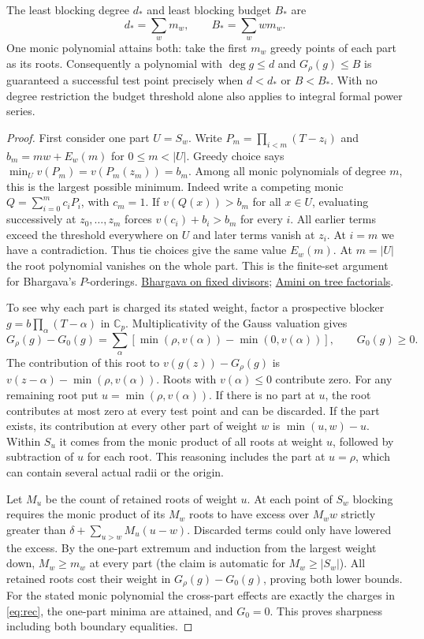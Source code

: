 \begin{theorem}\label{th:exact}
The least blocking degree $d_*$ and least blocking budget $B_*$ are
\[
 d_*=\sum_w m_w,\qquad B_*=\sum_w w m_w.
\]
One monic polynomial attains both: take the first $m_w$ greedy points of each
part as its roots. Consequently a polynomial with $\deg g\le d$ and
$G_\rho(g)\le B$ is guaranteed a successful test point precisely when
$d<d_*$ or $B<B_*$. With no degree restriction the budget threshold alone
also applies to integral formal power series.
\end{theorem}

\begin{proof}
First consider one part $U=S_w$. Write $P_m=\prod_{i<m}(T-z_i)$ and
$b_m=mw+E_w(m)$ for $0\le m<|U|$. Greedy choice says
$\min_U v(P_m)=v(P_m(z_m))=b_m$. Among all monic polynomials of degree
$m$, this is the largest possible minimum. Indeed write a competing
monic $Q=\sum_{i=0}^m c_i P_i$, with $c_m=1$. If $v(Q(x))>b_m$ for all
$x\in U$, evaluating successively at $z_0,\ldots,z_m$ forces
$v(c_i)+b_i>b_m$ for every $i$. All earlier terms exceed the threshold
everywhere on $U$ and later terms vanish at $z_i$. At $i=m$ we have a
contradiction. Thus tie choices give the same value $E_w(m)$.
At $m=|U|$ the root polynomial vanishes on the whole part.
This is the finite-set argument for Bhargava's $P$-orderings.
\href{https://doi.org/10.1006/jnth.1998.2220}{Bhargava on fixed divisors};
\href{https://arxiv.org/abs/1611.02142}{Amini on tree factorials}.

To see why each part is charged its stated weight, factor a prospective
blocker $g=b\prod_\alpha(T-\alpha)$ in $\mathbb C_p$. Multiplicativity
of the Gauss valuation gives
\[
 G_\rho(g)-G_0(g)=\sum_\alpha
 [\min(\rho,v(\alpha))-\min(0,v(\alpha))],\qquad G_0(g)\ge0.
\]
The contribution of this root to $v(g(z))-G_\rho(g)$ is
$v(z-\alpha)-\min(\rho,v(\alpha))$. Roots with $v(\alpha)\le0$
contribute zero. For any remaining root put $u=\min(\rho,v(\alpha))$.
If there is no part at $u$, the root contributes at most zero at every
test point and can be discarded. If the part exists, its contribution
at every other part of weight $w$ is $\min(u,w)-u$. Within $S_u$ it
comes from the monic product of all roots at weight $u$, followed by
subtraction of $u$ for each root. This reasoning includes the part at
$u=\rho$, which can contain several actual radii or the origin.

Let $M_u$ be the count of retained roots of weight $u$. At each point
of $S_w$ blocking requires the monic product of its $M_w$ roots to have
excess over $M_ww$ strictly greater than
$\delta+\sum_{u>w}M_u(u-w)$. Discarded terms could only have lowered
the excess. By the one-part extremum and induction from the largest
weight down, $M_w\ge m_w$ at every part (the claim is automatic for
$M_w\ge |S_w|$). All retained roots cost their weight in
$G_\rho(g)-G_0(g)$, proving both lower bounds. For the stated monic
polynomial the cross-part effects are exactly the charges in
\eqref{eq:rec}, the one-part minima are attained, and $G_0=0$.
This proves sharpness including both boundary equalities.


\end{proof}
